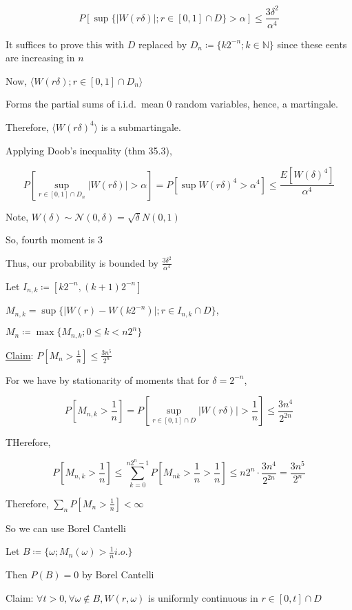 \documentclass{article}
\theoremstyle{definition}
\begin{document}
\[
    P[\sup \{ \vert W(r \delta) \vert ; r\in [0,1]\cap D \} > \alpha ] \leq \frac{3 \delta^2}{\alpha^4}
\]

It suffices to prove this with \(D\) replaced by \(D_n \coloneqq \{ k 2^{-n} ; k\in \mathbb{N} \} \) since these eents are increasing in \(n\) 

Now, \(\langle W(r \delta) ; r \in [0,1] \cap D_n \rangle \) 

Forms the partial sums of i.i.d.\ mean \(0\) random variables, hence, a martingale.

Therefore, \(\langle W(r \delta)^4 \rangle \) is a submartingale.

Applying Doob's inequality (thm 35.3),

\[
    P[\sup_{r\in [0,1]\cap D_n} \vert W(r \delta) \vert > \alpha ] = P[\sup W(r \delta)^4 > \alpha ^4] \leq \frac{E[W(\delta)^4]}{\alpha^4}
\]

Note, \(W(\delta)\sim \mathcal{N}(0,\delta)=\sqrt{\delta} N(0,1)\) 

So, fourth moment is \(3\) 

Thus, our probability is bounded by \(\frac{3 \delta^2}{\alpha^4}\) 

Let \(I_{n,k} \coloneqq [k 2^{-n}, (k+1)2^{-n}]\) 

\(M_{n,k}=\sup \{ \vert W(r) - W(k 2^{-n}) \vert ; r\in I_{n,k}\cap D \} \),

\(M_n \coloneqq \max \{ M_{n,k}; 0 \leq k < n 2^n\} \)

\underline{Claim}: \(P[M_n > \frac{1}{n}] \leq \frac{3n^5}{2^n}\) 

For we have by stationarity of moments that for \(\delta  = 2^{-n}\),

\[
    P[M_{n,k}>\frac{1}{n}] = P[\sup_{r\in [0,1]\cap D} \vert W(r \delta) \vert > \frac{1}{n} ] \leq \frac{3n^4}{2^{2n}}
\]

THerefore,

\[
    P[M_{n,k}>\frac{1}{n}] \leq \sum_{k=0}^{n2^n - 1} P[M_{nk}>\frac{1}{n}>\frac{1}{n}] \leq n 2^n \cdot \frac{3n^4}{2^{2n}} = \frac{3n^5}{2^n} 
\]

Therefore, \(\sum_{n} P[M_n > \frac{1}{n}] < \infty\) 

So we can use Borel Cantelli

Let \(B\coloneqq \{ \omega ; M_n(\omega) > \frac{1}{n} i.o. \} \) 

Then \(P(B)=0\) by Borel Cantelli

Claim: \(\forall t > 0, \forall \omega \not\in B, W(r, \omega)\) is uniformly continuous in \(r\in [0,t]\cap D\) 
\end{document}

